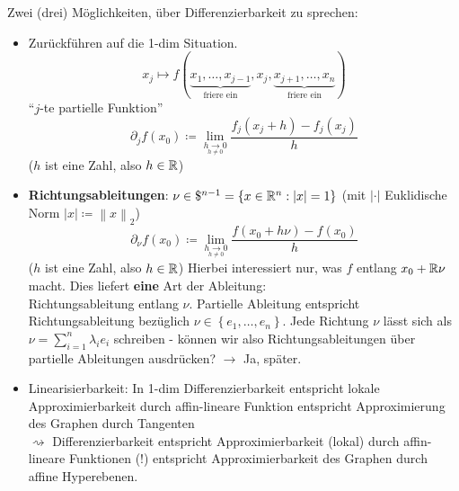 Zwei (drei) Möglichkeiten, über Differenzierbarkeit zu sprechen:
\begin{itemize}
	\item Zurückführen auf die 1-dim Situation.
		\[
			x_j \mapsto f( \underbrace{ x_1, \dotsc, x_{j - 1} }_{\text{friere ein} } , x_{j} , \underbrace{ x_{j + 1} , \dotsc, x_n }_{\text{friere ein} } )
		\]
		``$ j $-te partielle Funktion''
		\[
			\partial_j f(x_0) \coloneqq \lim_{\underset{h \neq 0}{h \to 0} } \frac{ f_j (x_j + h) - f_j(x_j) }{ h } 
		\]
		($ h $ ist eine Zahl, also $ h \in \mathbb{R}  $)
	\item \textbf{Richtungsableitungen}: $ \nu \in \mathdollar^{n - 1} = \left\{ x \in \mathbb{R} ^n : \left| x \right|  = 1 \right\}  $ (mit $ \left| \cdot  \right|  $ Euklidische Norm $ \left| x \right| \coloneqq \left\| x \right\| _2 $)
		\[
			\partial_{\nu} f(x_0) \coloneqq \lim_{\underset{h \neq 0}{h \to 0}} \frac{ f(x_0 + h \nu) - f(x_0) }{ h } 
		\]
		($ h $ ist eine Zahl, also $ h \in \mathbb{R}  $)
		Hierbei interessiert nur, was $ f $ entlang $ x_0 + \mathbb{R} \nu $ macht.
		Dies liefert \textbf{eine} Art der Ableitung:\\
		Richtungsableitung entlang $ \nu $.
		Partielle Ableitung entspricht Richtungsableitung bezüglich $ \nu \in \left\{ e_1, \dotsc, e_n \right\}  $.
		Jede Richtung $ \nu $ lässt sich als $ \nu = \sum_{i=1}^{n} \lambda_i e_i $ schreiben - können wir also Richtungsableitungen über partielle Ableitungen ausdrücken? $ \to  $ Ja, später.
	\item Linearisierbarkeit: In 1-dim Differenzierbarkeit entspricht lokale Approximierbarkeit durch affin-lineare Funktion entspricht Approximierung des Graphen durch Tangenten\\
		$ \rightsquigarrow $ Differenzierbarkeit entspricht Approximierbarkeit (lokal) durch affin-lineare Funktionen (!) entspricht Approximierbarkeit des Graphen durch affine Hyperebenen.
\end{itemize}

